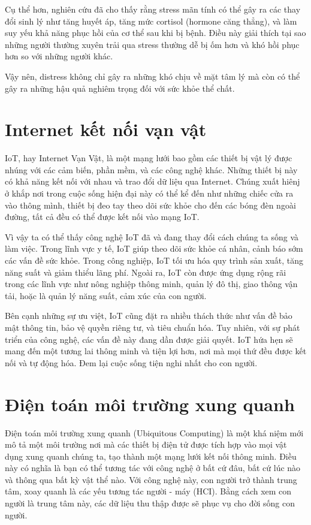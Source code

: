 Cụ thể hơn, nghiên cứu đã cho thấy rằng stress mãn tính có thể gây ra các thay đổi sinh lý như tăng huyết áp, tăng mức cortisol (hormone căng thẳng)\cite{cortisol}, và làm suy yếu khả năng phục hồi của cơ thể sau khi bị bệnh. Điều này giải thích tại sao những người thường xuyên trải qua stress thường dễ bị ốm hơn và khó hồi phục hơn so với những người khác.

Vậy nên, distress không chỉ gây ra những khó chịu về mặt tâm lý mà còn có thể gây ra những hậu quả nghiêm trọng đối với sức khỏe thể chất.


\section{Internet kết nối vạn vật}
IoT, hay Internet Vạn Vật, là một mạng lưới bao gồm các thiết bị vật lý được nhúng với các cảm biến, phần mềm, và các công nghệ khác. Những thiết bị này có khả năng kết nối với nhau và trao đổi dữ liệu qua Internet. Chúng xuất hiênj ở khắp nơi trong cuộc sống hiện đại này có thể kể đến như những chiếc cửa ra vào thông mình, thiết bị đeo tay theo dõi sức khỏe cho đến các bóng đèn ngoài đường, tất cả đều có thể được kết nối vào mạng IoT.

Vì vậy ta có thể thấy công nghệ IoT đã và đang thay đổi cách chúng ta sống và làm việc. Trong lĩnh vực y tế, IoT giúp theo dõi sức khỏe cá nhân, cảnh báo sớm các vấn đề sức khỏe. Trong công nghiệp, IoT tối ưu hóa quy trình sản xuất, tăng năng suất và giảm thiểu lãng phí. Ngoài ra, IoT còn được ứng dụng rộng rãi trong các lĩnh vực như nông nghiệp thông minh, quản lý đô thị, giao thông vận tải, hoặc là quản lý năng suất, cảm xúc của con người.

Bên cạnh những sự ưu việt, IoT cũng đặt ra nhiều thách thức như vấn đề bảo mật thông tin, bảo vệ quyền riêng tư, và tiêu chuẩn hóa. Tuy nhiên, với sự phát triển của công nghệ, các vấn đề này đang dần được giải quyết. IoT hứa hẹn sẽ mang đến một tương lai thông minh và tiện lợi hơn, nơi mà mọi thứ đều được kết nối và tự động hóa. Đem lại cuộc sống tiện nghi nhất cho con người.

\section{Điện toán môi trường xung quanh}
Điện toán môi trường xung quanh (Ubiquitous Computing) là một khá niệm mới mô tả một môi trường nơi mà các thiết bị điện tử được tích hợp vào mọi vật dụng xung quanh chúng ta, tạo thành một mạng lưới kết nối thông minh. Điều này có nghĩa là bạn có thể tương tác với công nghệ ở bất cứ đâu, bất cứ lúc nào và thông qua bất kỳ vật thể nào. Với công nghệ này, con người trở thành trung tâm, xoay quanh là các yếu tương tác người - máy (HCI). Bằng cách xem con người là trung tâm này, các dữ liệu thu thập được sẽ phục vụ cho đời sống con người.

